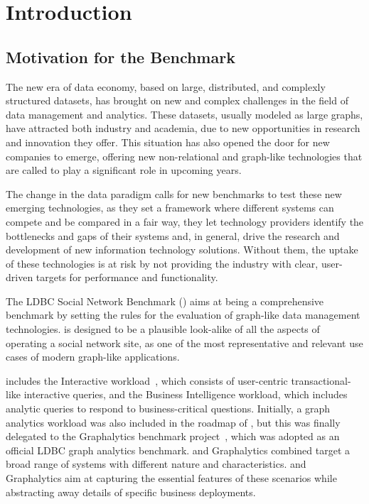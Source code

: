 \chapter{Introduction}
\label{sec:introduction}


\section{Motivation for the Benchmark}

The new era of data economy, based on large, distributed, and complexly
structured datasets, has brought on new and complex challenges in the field of
data management and analytics. These datasets, usually modeled as large
graphs, have attracted both industry and academia, due to new
opportunities in research and innovation they offer. This situation has also
opened the door for new companies to emerge, offering new non-relational and
graph-like technologies that are called to play a significant role in upcoming
years.

The change in the data paradigm calls for new benchmarks to test these new
emerging technologies, as they set a framework where different systems can
compete and be compared in a fair way, they let technology providers identify
the bottlenecks and gaps of their systems and, in general, drive the research
and development of new information technology solutions. Without them, the
uptake of these technologies is at risk by not providing the industry with
clear, user-driven targets for performance and functionality.

The LDBC Social Network Benchmark (\ldbcsnb) aims at being a comprehensive
benchmark by setting the rules for the evaluation of graph-like data management
technologies.  \ldbcsnb is designed to be a plausible look-alike of all the
aspects of operating a social network site, as one of the most representative
and relevant use cases of modern graph-like applications.

\ldbcsnb includes the Interactive
workload~\cite{DBLP:conf/sigmod/ErlingALCGPPB15}, which consists of user-centric
transactional-like interactive queries, and the Business Intelligence workload,
which includes analytic queries to respond to business-critical questions.
Initially, a graph analytics workload was also included in the roadmap of
\ldbcsnb, but this was finally delegated to the Graphalytics benchmark
project~\cite{DBLP:journals/pvldb/IosupHNHPMCCSAT16,DBLP:journals/corr/abs-2011-15028}, which was adopted as an official LDBC graph
analytics benchmark. \ldbcsnb and Graphalytics combined target a broad range of
systems with different nature and characteristics.  \ldbcsnb and Graphalytics
aim at capturing the essential features of these scenarios while
abstracting away details of specific business deployments.


